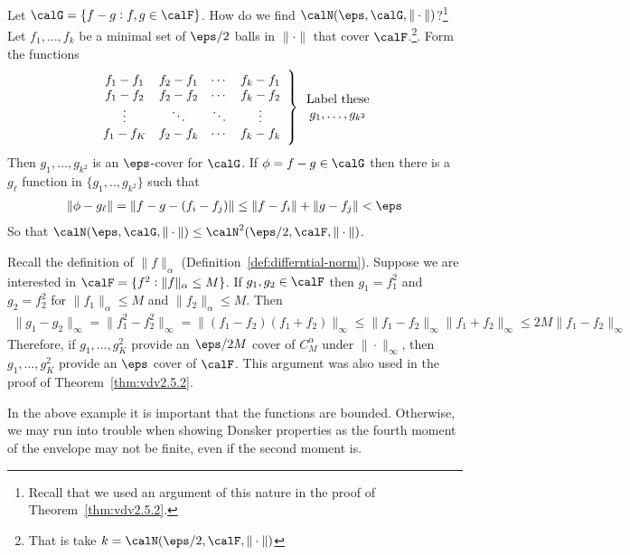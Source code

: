 \begin{example*}
	Let \(\calG = \left\{f-g: f,g \in\calF\right\}\). How do we find \(\calN(\eps, \calG,\|\cdot\|)\)?\footnote{Recall that we used an argument of this nature in the proof of Theorem~\ref{thm:vdv2.5.2}.} Let \(f_1,\dots,f_k\) be a minimal set of \(\eps/2\) balls in \(\|\cdot\|\) that cover \(\calF\).\footnote{That is take \(k = \calN(\eps/2,\calF,\|\cdot\|)\)}. Form the functions
	\[
		\left.\begin{array}{cccc}
		f_1 - f_1 & f_2 - f_1 & \cdots & f_k - f_1 \\
		f_1 - f_2 & f_2 - f_2 & \cdots & f_k - f_2 \\ 
		\vdots & \ddots & \ddots & \vdots \\
		f_1 - f_K & f_2 - f_k & \cdots & f_k - f_k
		\end{array} \right\}\parbox{6em}{\centering Label these \\ \(g_1,\dots,g_{k^2}\)}
	\]
	Then \(g_1,\dots, g_{k^2}\) is an \(\eps\)-cover for \(\calG\). If \(\phi = f-g\in\calG\) then there is a \(g_\ell\) function in \(\{g_1,..,g_{k^2}\}\) such that
	\begin{align*}
		\|\phi-g_\ell\| = \|f-g - (f_i - f_j)\| \leq \|f-f_i\| + \|g-f_j\| < \eps	
	\end{align*}
	So that \(\calN(\eps,\calG,\|\cdot\|) \leq  \calN^2(\eps/2,\calF,\|\cdot\|)\).
\end{example*}
\begin{example*}
	Recall the definition of \(\|f\|_\alpha\) (Definition~\ref{def:differntial-norm}). Suppose we are interested in \(\calF = \{f^2: \|f\|_\alpha \leq M\}\). If \(g_1,g_2\in\calF\) then \(g_1=f_1^2\) and \(g_2 = f_2^2\) for \(\|f_1\|_\alpha \leq M\) and \(\|f_2\|_\alpha \leq M\). Then
	\begin{align*}
		\|g_1-g_2\|_\infty = \|f_1^2-f_2^2\|_\infty = \|(f_1-f_2)(f_1+f_2)\|_\infty 	\leq \|f_1-f_2\|_\infty \|f_1 + f_2\|_\infty \leq  2M\|f_1-f_2\|_\infty
	\end{align*}
	Therefore, if \(g_1,\dots,g_K^2\) provide an \(\eps/2M\) cover of \(C_M^\alpha\) under \(\|\cdot\|_\infty\), then \(g_1,\dots,g_K^2\) provide an \(\eps\) cover of \(\calF\). This argument was also used in the proof of Theorem~\ref{thm:vdv2.5.2}. 
\end{example*}
\begin{remark*}
	In the above example it is important that the functions are bounded. Otherwise, we may run into trouble when showing Donsker properties as the fourth moment of the envelope may not be finite, even if the second moment is. 
\end{remark*}
